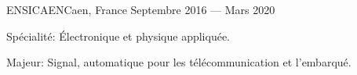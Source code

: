 
    {ENSICAEN}{Caen, France}
    {Septembre 2016 --- Mars 2020}
    {\begin{additems}
        \item Spécialité: Électronique et physique appliquée.
        \item Majeur: Signal, automatique pour les télécommunication et l'embarqué.
    \end{additems}}

%
